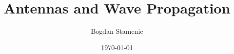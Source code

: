 

\newcommand{\FormelsammlungTitel}{Antennas and Wave Propagation}
\newcommand{\FormelsammlungAutor}{Bogdan Stamenic}
\setcounter{tocdepth}{2} %


	\title{\FormelsammlungTitel}
	\author{\FormelsammlungAutor}
	\date{\today}
	\begin{multicols}{3}
        {\small%
			\maketitle
			\tableofcontents
        
        
        
        
        
        
        
        
        
        }
	\end{multicols}


